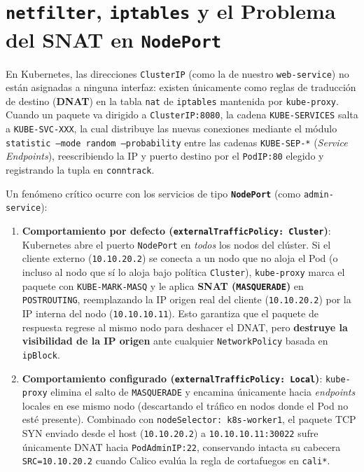 \section{\texttt{netfilter}, \texttt{iptables} y el Problema del SNAT en \texttt{NodePort}}

En Kubernetes, las direcciones \texttt{ClusterIP} (como la de nuestro \texttt{web-service}) no están asignadas a ninguna interfaz: existen únicamente como reglas de traducción de destino (\textbf{DNAT}) en la tabla \texttt{nat} de \texttt{iptables} mantenida por \texttt{kube-proxy}. Cuando un paquete va dirigido a \texttt{ClusterIP:8080}, la cadena \texttt{KUBE-SERVICES} salta a \texttt{KUBE-SVC-XXX}, la cual distribuye las nuevas conexiones mediante el módulo \texttt{statistic --mode random --probability} entre las cadenas \texttt{KUBE-SEP-*} (\textit{Service Endpoints}), reescribiendo la IP y puerto destino por el \texttt{PodIP:80} elegido y registrando la tupla en \texttt{conntrack}.

Un fenómeno crítico ocurre con los servicios de tipo \textbf{\texttt{NodePort}} (como \texttt{admin-service}):
\begin{enumerate}
  \item \textbf{Comportamiento por defecto (\texttt{externalTrafficPolicy: Cluster})}: Kubernetes abre el puerto \texttt{NodePort} en \emph{todos} los nodos del clúster. Si el cliente externo (\texttt{10.10.20.2}) se conecta a un nodo que no aloja el Pod (o incluso al nodo que sí lo aloja bajo política \texttt{Cluster}), \texttt{kube-proxy} marca el paquete con \texttt{KUBE-MARK-MASQ} y le aplica \textbf{SNAT (\texttt{MASQUERADE})} en \texttt{POSTROUTING}, reemplazando la IP origen real del cliente (\texttt{10.10.20.2}) por la IP interna del nodo (\texttt{10.10.10.11}). Esto garantiza que el paquete de respuesta regrese al mismo nodo para deshacer el DNAT, pero \textbf{destruye la visibilidad de la IP origen} ante cualquier \texttt{NetworkPolicy} basada en \texttt{ipBlock}.
  \item \textbf{Comportamiento configurado (\texttt{externalTrafficPolicy: Local})}: \texttt{kube-proxy} elimina el salto de \texttt{MASQUERADE} y encamina únicamente hacia \textit{endpoints} locales en ese mismo nodo (descartando el tráfico en nodos donde el Pod no esté presente). Combinado con \texttt{nodeSelector: k8s-worker1}, el paquete TCP SYN enviado desde el host (\texttt{10.10.20.2}) a \texttt{10.10.10.11:30022} sufre únicamente DNAT hacia \texttt{PodAdminIP:22}, conservando intacta su cabecera \texttt{SRC=10.10.20.2} cuando Calico evalúa la regla de cortafuegos en \texttt{cali*}.
\end{enumerate}
